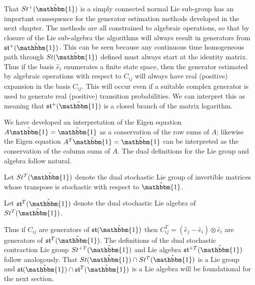 That $St^{+}(\hat{\mathbbm{1}})$ is a simply connected normal Lie sub-group has 
an important consequence for the generator estimation methods developed in the 
next chapter. The methods are all constrained to algebraic operations, so that
by closure of the Lie sub-algebra the algorithms will always result in 
generators from $\mathfrak{st}^{+}(\hat{\mathbbm{1}})$. This can be seen because 
any continuous time homogeneous path through $St(\hat{\mathbbm{1}})$ defined 
must always start at the identity matrix. Thus if the basis $\hat{e}_i$ 
enumerates a finite state space, then the generator estimated by algebraic 
operations with respect to $C_{ij}$ will always have real (positive) expansion 
in the basis $C_{ij}$. This will occur even if a suitable complex generator is 
used to generate real (positive) transition probabilities. We can interpret this 
as meaning that $\mathfrak{st}^{+}(\hat{\mathbbm{1}})$ is a closed branch of the 
matrix logarithm. 


We have developed an interpretation of the Eigen equation $A \hat{\mathbbm{1}} = \hat{\mathbbm{1}}$
as a conservation of the row sums of $A$; likewise the Eigen equation $A^T \hat{\mathbbm{1}} = \hat{\mathbbm{1}}$
can be interpreted as the conservation of the column sums of $A$. The dual 
definitions for the Lie group and algebra follow natural.

\begin{definition}
	Let $St^T(\hat{\mathbbm{1}})$ denote the dual stochastic Lie group of 
	invertible matrices whose transpose is stochastic with respect to $\hat{\mathbbm{1}}$.
\end{definition}

\begin{definition}
	Let $\mathfrak{st}^T(\hat{\mathbbm{1}})$ denote the dual stochastic Lie 
	algebra of $St^T(\hat{\mathbbm{1}})$.
\end{definition}

Thus if $C_{ij}$ are generators of $\mathfrak{st}(\hat{\mathbbm{1}})$ then $C_{ij}^T = \left(\hat{e}_j - \hat{e}_i \right) \otimes \hat{e}_i$
are generators of $\mathfrak{st}^T(\hat{\mathbbm{1}})$. The definitions of the
dual stochastic contraction Lie group $St^{+T}(\hat{\mathbbm{1}})$ and Lie algebra $\mathfrak{st}^{+T}(\hat{\mathbbm{1}})$
follow analogously. That $St(\hat{\mathbbm{1}}) \cap St^T(\hat{\mathbbm{1}})$ 
is a Lie group and $\mathfrak{st}(\hat{\mathbbm{1}}) \cap \mathfrak{st}^T(\hat{\mathbbm{1}})$ 
is a Lie algebra will be foundational for the next section.

